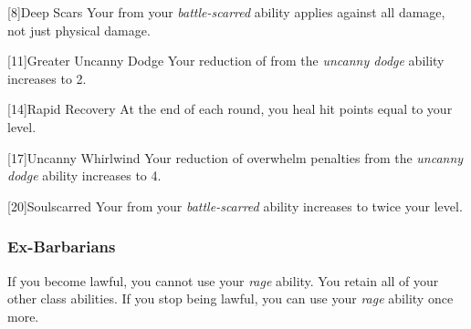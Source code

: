             [8]{Deep Scars} Your  from your \textit{battle-scarred} ability applies against all damage, not just physical damage.

            [11]{Greater Uncanny Dodge}
            Your reduction of  from the \textit{uncanny dodge} ability increases to 2.

            [14]{Rapid Recovery}
            At the end of each round, you heal hit points equal to your level.

            [17]{Uncanny Whirlwind}
            Your reduction of overwhelm penalties from the \textit{uncanny dodge} ability increases to 4.

            [20]{Soulscarred}
            Your  from your \textit{battle-scarred} ability increases to twice your level.

        \subsubsection{Ex-Barbarians}
            If you become lawful, you cannot use your \textit{rage} ability.
            You retain all of your other class abilities.
            If you stop being lawful, you can use your \textit{rage} ability once more.

